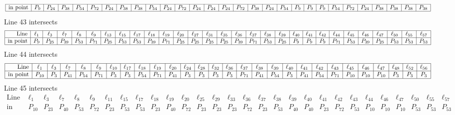 \documentclass{article}
\begin{document}
{$$\begin{array}{|r*{28}{|c}|}
\hline
\mbox{in point}  & P_{9} & P_{24} & P_{38} & P_{54} & P_{72} & P_{24} & P_{38} & P_{38} & P_{54} & P_{24} & P_{72} & P_{24} & P_{24} & P_{24} & P_{72} & P_{38} & P_{24} & P_{54} & P_{9} & P_{9} & P_{9} & P_{54} & P_{72} & P_{24} & P_{38} & P_{38} & P_{38} & P_{38}\\
\hline
\end{array}
$$
Line 43 intersects 
$$
\begin{array}{|r*{28}{|c}|}
\hline
\mbox{Line}  & \ell_{1} & \ell_{3} & \ell_{7} & \ell_{8} & \ell_{9} & \ell_{13} & \ell_{15} & \ell_{17} & \ell_{18} & \ell_{19} & \ell_{20} & \ell_{27} & \ell_{31} & \ell_{35} & \ell_{36} & \ell_{37} & \ell_{38} & \ell_{39} & \ell_{40} & \ell_{41} & \ell_{42} & \ell_{44} & \ell_{45} & \ell_{46} & \ell_{47} & \ell_{50} & \ell_{55} & \ell_{57}\\
\hline
\mbox{in point}  & P_{9} & P_{25} & P_{39} & P_{53} & P_{71} & P_{25} & P_{53} & P_{53} & P_{39} & P_{71} & P_{25} & P_{25} & P_{25} & P_{25} & P_{39} & P_{71} & P_{53} & P_{25} & P_{9} & P_{9} & P_{9} & P_{71} & P_{53} & P_{39} & P_{25} & P_{53} & P_{53} & P_{53}\\
\hline
\end{array}
$$
Line 44 intersects 
$$
\begin{array}{|r*{27}{|c}|}
\hline
\mbox{Line}  & \ell_{1} & \ell_{3} & \ell_{7} & \ell_{8} & \ell_{9} & \ell_{10} & \ell_{17} & \ell_{18} & \ell_{19} & \ell_{20} & \ell_{24} & \ell_{28} & \ell_{32} & \ell_{36} & \ell_{37} & \ell_{38} & \ell_{39} & \ell_{40} & \ell_{41} & \ell_{42} & \ell_{43} & \ell_{45} & \ell_{46} & \ell_{47} & \ell_{48} & \ell_{52} & \ell_{56}\\
\hline
\mbox{in point}  & P_{10} & P_{3} & P_{41} & P_{54} & P_{71} & P_{3} & P_{3} & P_{54} & P_{71} & P_{41} & P_{3} & P_{3} & P_{3} & P_{3} & P_{71} & P_{41} & P_{54} & P_{3} & P_{41} & P_{54} & P_{71} & P_{10} & P_{10} & P_{10} & P_{3} & P_{3} & P_{3}\\
\hline
\end{array}
$$
Line 45 intersects 
$$
\begin{array}{|r*{28}{|c}|}
\hline
\mbox{Line}  & \ell_{1} & \ell_{3} & \ell_{7} & \ell_{8} & \ell_{9} & \ell_{11} & \ell_{15} & \ell_{17} & \ell_{18} & \ell_{19} & \ell_{20} & \ell_{25} & \ell_{29} & \ell_{33} & \ell_{36} & \ell_{37} & \ell_{38} & \ell_{39} & \ell_{40} & \ell_{41} & \ell_{42} & \ell_{43} & \ell_{44} & \ell_{46} & \ell_{47} & \ell_{50} & \ell_{55} & \ell_{57}\\
\hline
\mbox{in point}  & P_{10} & P_{23} & P_{40} & P_{53} & P_{72} & P_{23} & P_{53} & P_{53} & P_{23} & P_{40} & P_{72} & P_{23} & P_{23} & P_{23} & P_{72} & P_{23} & P_{53} & P_{40} & P_{40} & P_{23} & P_{72} & P_{53} & P_{10} & P_{10} & P_{10} & P_{53} & P_{53} & P_{53}\\

\end{array}$$}
\end{document}
